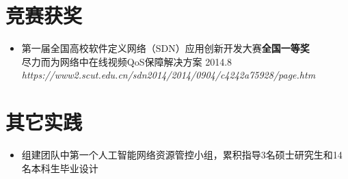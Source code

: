 \documentclass{resume}
\begin{document}
\section{竞赛获奖}
\begin{itemize}[parsep=0.2ex]
  \item 第一届全国高校软件定义网络（SDN）应用创新开发大赛\textbf{全国一等奖}
  \\尽力而为网络中在线视频QoS保障解决方案 2014.8\\ \textit{https://www2.scut.edu.cn/sdn2014/2014/0904/c4242a75928/page.htm}
\end{itemize}


\section{其它实践}
\begin{itemize}[parsep=0.2ex]
    \item 组建团队中第一个人工智能网络资源管控小组，累积指导3名硕士研究生和14名本科生毕业设计
\end{itemize}

%
%
\end{document}
